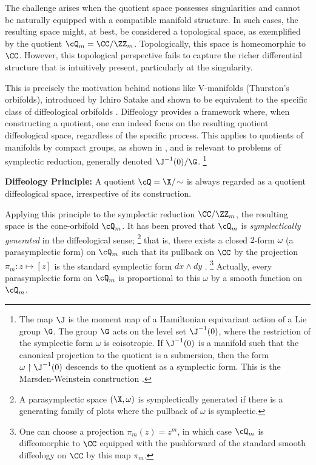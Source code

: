 \begin{article}
    The challenge arises when the quotient space possesses singularities and cannot be naturally equipped with a compatible manifold structure.
    In such cases,
    the resulting space might,
    at best,
    be considered a topological space, as exemplified by the quotient $\cQ_m = \CC/\ZZ_m$.
    Topologically,
    this space is homeomorphic to $\CC$.
    However,
    this topological perspective fails to capture the richer differential structure that is intuitively present,
    particularly at the singularity.
    
    This is precisely the motivation behind notions like V-manifolds (Thurston's orbifolds),
    introduced by Ichiro Satake \cite{Sat56} and shown to be equivalent to the specific class of diffeological orbifolds \cite{IKZ10}.
    Diffeology provides a framework where,
    when constructing a quotient,
    one can indeed focus on the resulting quotient diffeological space,
    regardless of the specific process.
    This applies to quotients of manifolds by compact groups,
    as shown in \cite{GIZ25},
    and is relevant to problems of symplectic reduction,
    generally denoted $\J^{-1}(0)/\G$.%
    \footnote{The map $\J$ is the moment map of a Hamiltonian equivariant action of a Lie group $\G$.
    The group $\G$ acts on the level set $\J^{-1}(0)$,
    where the restriction of the symplectic form $\omega$ is coisotropic.
    If $\J^{-1}(0)$ is a manifold such that the canonical projection to the quotient is a submersion,
    then the form $\omega \restriction \J^{-1}(0)$ descends to the quotient as a symplectic form.
    This is the Marsden-Weinstein construction \cite{MW74}.}
    
    \smallskip
    \textbf{Diffeology Principle:} A quotient $\cQ = \X/\!\sim$ is always regarded as a quotient diffeological space,
    irrespective of its construction.
    \smallskip
    
    Applying this principle to the symplectic reduction $\CC/\ZZ_m$,
    the resulting space is the cone-orbifold $\cQ_m$.
    It has been proved that $\cQ_m$ is \emph{symplectically generated} in the diffeological sense;%
    \footnote{A parasymplectic space $(\X,\omega)$ is symplectically generated if there is a generating family \cite[]{PIZ13} of plots where the pullback of $\omega$ is symplectic.}
    that is,
    there exists a closed $2$-form $\omega$ (a parasymplectic form) on $\cQ_m$ such that its pullback on $\CC$ by the projection $\pi_m : z \mapsto [z]$ is the standard symplectic form $dx \wedge dy$ \cite[]{PIZ13}.%
    \footnote{One can choose a projection $\pi_m(z) = z^m$,
    in which case $\cQ_m$ is diffeomorphic to $\CC$ equipped with the pushforward of the standard smooth diffeology on $\CC$ by this map $\pi_m$.}
    Actually,
    every parasymplectic form on $\cQ_m$ is proportional to this $\omega$ by a smooth function on $\cQ_m$.
    

\end{article}

